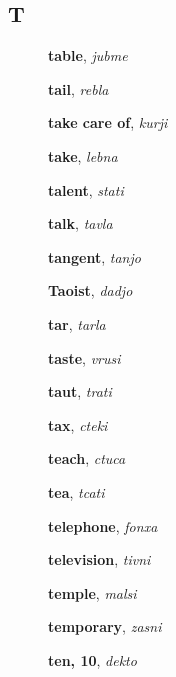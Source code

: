 \documentclass[12pt]{book}
\begin{document}
\subsection{T} %

\begin{description}

\item[ ] \textbf{table}, \textit{jubme}

\item[ ] \textbf{tail}, \textit{rebla}

\item[ ] \textbf{take care of}, \textit{kurji}

\item[ ] \textbf{take}, \textit{lebna}

\item[ ] \textbf{talent}, \textit{stati}

\item[ ] \textbf{talk}, \textit{tavla}

\item[ ] \textbf{tangent}, \textit{tanjo}

\item[ ] \textbf{Taoist}, \textit{dadjo}

\item[ ] \textbf{tar}, \textit{tarla}

\item[ ] \textbf{taste}, \textit{vrusi}

\item[ ] \textbf{taut}, \textit{trati}

\item[ ] \textbf{tax}, \textit{cteki}

\item[ ] \textbf{teach}, \textit{ctuca}

\item[ ] \textbf{tea}, \textit{tcati}

\item[ ] \textbf{telephone}, \textit{fonxa}

\item[ ] \textbf{television}, \textit{tivni}

\item[ ] \textbf{temple}, \textit{malsi}

\item[ ] \textbf{temporary}, \textit{zasni}

\item[ ] \textbf{ten, 10}, \textit{dekto}


\end{description}
\end{document}
